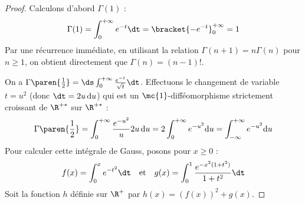 \begin{proof}
    
    \svspace Calculons d'abord $\Gamma(1)$ :
    \[ \Gamma(1) = \int_0^{+\infty} e^{-t} \dt = \bracket{-e^{-t}}_0^{+\infty} = 1 \]
    Par une récurrence immédiate, en utilisant la relation $\Gamma(n+1) = n\Gamma(n)$ pour $n \geqslant 1$, on obtient directement que $\Gamma(n) = (n-1)!$.

    
    \lvspace 
    \avspace 
    \svspace On a $\Gamma\paren{\frac{1}{2}} = \ds\int_0^{+\infty} \frac{e^{-t}}{\sqrt{t}} \dt$.
    Effectuons le changement de variable $t = u^2$ (donc $\dt = 2u\,\mathrm{d}u$) qui est un $\mc{1}$-difféomorphisme strictement croissant de $\R^{+*}$ sur $\R^{+*}$ :
    \[ \Gamma\paren{\frac{1}{2}} = \int_0^{+\infty} \frac{e^{-u^2}}{u} 2u\,\mathrm{d}u = 2 \int_0^{+\infty} e^{-u^2} \mathrm{d}u = \int_{-\infty}^{+\infty} e^{-u^2} \mathrm{d}u \]
    Pour calculer cette intégrale de Gauss, posons pour $x \geqslant 0$ :
    \[ f(x) = \int_0^x e^{-t^2} \dt \quad \text{et} \quad g(x) = \int_0^1 \frac{e^{-x^2(1+t^2)}}{1+t^2} \dt \]
    Soit la fonction $h$ définie sur $\R^+$ par $h(x) = (f(x))^2 + g(x)$.


\end{proof}
